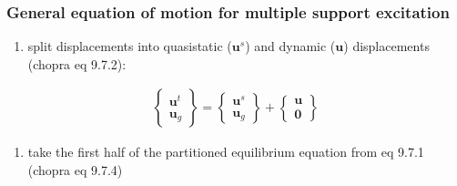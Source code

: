 \documentclass[letterpaper,10pt,english]{sphinxmanual}
\begin{document}
\subsubsection{General equation of motion for multiple support excitation}
\label{\detokenize{examples/05_MIMO_Event:General-equation-of-motion-for-multiple-support-excitation}}\begin{enumerate}
%
\item {} 
\sphinxAtStartPar
split displacements into quasi\sphinxhyphen{}static (\(\mathbf{u}^s\)) and dynamic (\(\mathbf{u}\)) displacements (chopra eq 9.7.2):

\end{enumerate}
\begin{equation*}
\begin{split}\begin{Bmatrix}
\mathbf{u}^t \\
\mathbf{u}_g
\end{Bmatrix}
=
\begin{Bmatrix}
\mathbf{u}^s \\
\mathbf{u}_g
\end{Bmatrix}
+
\begin{Bmatrix}
\mathbf{u} \\
\mathbf{0}
\end{Bmatrix}\end{split}
\end{equation*}\begin{enumerate}
%
\setcounter{enumi}{1}
\item {} 
\sphinxAtStartPar
take the first half of the partitioned equilibrium equation from eq 9.7.1 (chopra eq 9.7.4)

\end{enumerate}
\end{document}
